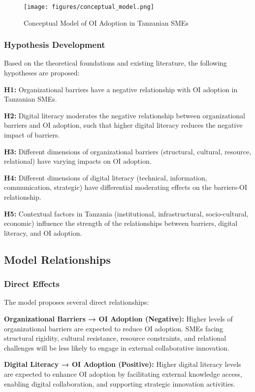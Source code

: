 \begin{figure}[H]
\centering
\texttt{[image: figures/conceptual\_model.png]}
\caption{Conceptual Model of OI Adoption in Tanzanian SMEs}
\label{fig:conceptual_model}
\end{figure}

\subsubsection{Hypothesis Development}

Based on the theoretical foundations and existing literature, the following hypotheses are proposed:

\textbf{H1:} Organizational barriers have a negative relationship with OI adoption in Tanzanian SMEs.

\textbf{H2:} Digital literacy moderates the negative relationship between organizational barriers and OI adoption, such that higher digital literacy reduces the negative impact of barriers.

\textbf{H3:} Different dimensions of organizational barriers (structural, cultural, resource, relational) have varying impacts on OI adoption.

\textbf{H4:} Different dimensions of digital literacy (technical, information, communication, strategic) have differential moderating effects on the barriers-OI relationship.

\textbf{H5:} Contextual factors in Tanzania (institutional, infrastructural, socio-cultural, economic) influence the strength of the relationships between barriers, digital literacy, and OI adoption.

\subsection{Model Relationships}

\subsubsection{Direct Effects}
The model proposes several direct relationships:

\textbf{Organizational Barriers → OI Adoption (Negative):}
Higher levels of organizational barriers are expected to reduce OI adoption. SMEs facing structural rigidity, cultural resistance, resource constraints, and relational challenges will be less likely to engage in external collaborative innovation.

\textbf{Digital Literacy → OI Adoption (Positive):}
Higher digital literacy levels are expected to enhance OI adoption by facilitating external knowledge access, enabling digital collaboration, and supporting strategic innovation activities.

